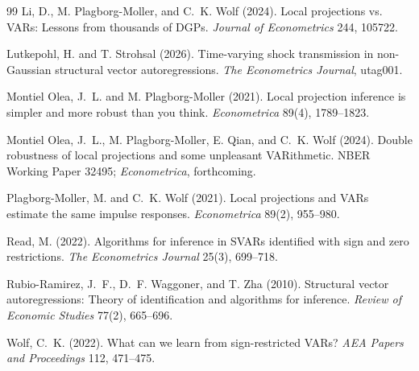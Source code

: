 \documentclass[11pt]{article}
\theoremstyle{definition}
\theoremstyle{plain}
\theoremstyle{remark}
\begin{document}
\begin{thebibliography}{99}
Li, D., M. Plagborg-Moller, and C.~K. Wolf (2024).
Local projections vs. VARs: Lessons from thousands of DGPs.
\emph{Journal of Econometrics} 244, 105722.

Lutkepohl, H. and T. Strohsal (2026).
Time-varying shock transmission in non-Gaussian structural vector autoregressions.
\emph{The Econometrics Journal}, utag001.

Montiel Olea, J.~L. and M. Plagborg-Moller (2021).
Local projection inference is simpler and more robust than you think.
\emph{Econometrica} 89(4), 1789--1823.

Montiel Olea, J.~L., M. Plagborg-Moller, E. Qian, and C.~K. Wolf (2024).
Double robustness of local projections and some unpleasant VARithmetic.
NBER Working Paper 32495; \emph{Econometrica}, forthcoming.

Plagborg-Moller, M. and C.~K. Wolf (2021).
Local projections and VARs estimate the same impulse responses.
\emph{Econometrica} 89(2), 955--980.

Read, M. (2022).
Algorithms for inference in SVARs identified with sign and zero restrictions.
\emph{The Econometrics Journal} 25(3), 699--718.

Rubio-Ramirez, J.~F., D.~F. Waggoner, and T. Zha (2010).
Structural vector autoregressions: Theory of identification and algorithms for inference.
\emph{Review of Economic Studies} 77(2), 665--696.

Wolf, C.~K. (2022).
What can we learn from sign-restricted VARs?
\emph{AEA Papers and Proceedings} 112, 471--475.
\end{thebibliography}
\end{document}
